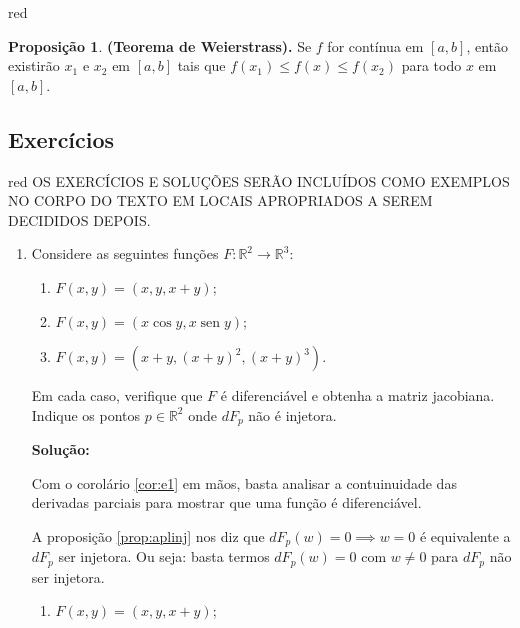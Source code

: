 \documentclass[12pt,leqno,twoside]{amsart}
\theoremstyle{definition}
\newtheorem{proposicao}{Proposição}[section]
\newcommand{\sen}{\operatorname{sen}}
\begin{document}
\begin{color}{red}
\vspace{0.3cm}

\begin{proposicao}
	\textbf{(Teorema de Weierstrass).} Se $f$ for contínua em $[a,b]$, então existirão $x_1$ e $x_2$ em $[a,b]$ tais que $f(x_1) \leq f(x) \leq f(x_2)$ para todo $x$ em $[a,b]$.
\end{proposicao}

\vspace{0.3cm}

\subsection{Exercícios}
\begin{color}{red}
    OS EXERCÍCIOS E SOLUÇÕES SERÃO INCLUÍDOS COMO EXEMPLOS NO CORPO DO TEXTO EM LOCAIS APROPRIADOS  A SEREM DECIDIDOS DEPOIS.
\end{color}

\begin{enumerate}
	\item Considere as seguintes funções $F:\mathbb{R}^2 \to \mathbb{R}^3$:
		\begin{enumerate}
			\item $F(x,y) = (x,y,x+y)$;
			\item $F(x,y) = (x\cos y,x\sen y)$;
			\item $F(x,y) = \left(x+y, (x+y)^2,(x+y)^3\right)$.
		\end{enumerate}
		Em cada caso, verifique que $F$ é diferenciável e obtenha a matriz jacobiana. Indique os pontos $p\in \mathbb{R}^2$ onde $dF_p$ não é injetora.

		\textbf{Solução:}

		Com o corolário \ref{cor:e1} em mãos, basta analisar a contuinuidade das derivadas parciais para mostrar que uma função é diferenciável.

		A proposição \ref{prop:aplinj} nos diz que $dF_p(w) = 0 \implies w = 0$ é equivalente a  $dF_p$ ser injetora. Ou seja: basta termos $dF_p(w) =0$ com $w\neq 0$ para $dF_p$ não ser injetora.


		\begin{enumerate}
			\item $F(x,y) = (x,y,x+y)$;


\end{enumerate}
\end{enumerate}
\end{color}
\end{document}
